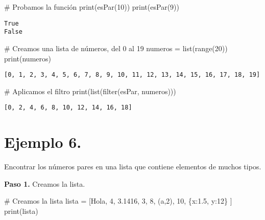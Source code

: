 \documentclass[
  letterpaper,
  DIV=11,
  numbers=noendperiod]{scrreprt}
\newenvironment{Shaded}{\begin{snugshade}}{\end{snugshade}}
\newcommand{\BuiltInTok}[1]{\textcolor[rgb]{0.00,0.23,0.31}{#1}}
\newcommand{\CommentTok}[1]{\textcolor[rgb]{0.37,0.37,0.37}{#1}}
\newcommand{\DecValTok}[1]{\textcolor[rgb]{0.68,0.00,0.00}{#1}}
\newcommand{\FloatTok}[1]{\textcolor[rgb]{0.68,0.00,0.00}{#1}}
\newcommand{\NormalTok}[1]{\textcolor[rgb]{0.00,0.23,0.31}{#1}}
\newcommand{\OperatorTok}[1]{\textcolor[rgb]{0.37,0.37,0.37}{#1}}
\newcommand{\StringTok}[1]{\textcolor[rgb]{0.13,0.47,0.30}{#1}}
\begin{document}
\begin{Shaded}
\begin{Highlighting}[]
\CommentTok{\# Probamos la función}
\BuiltInTok{print}\NormalTok{(esPar(}\DecValTok{10}\NormalTok{))}
\BuiltInTok{print}\NormalTok{(esPar(}\DecValTok{9}\NormalTok{))}
\end{Highlighting}
\end{Shaded}

\begin{verbatim}
True
False
\end{verbatim}

\begin{Shaded}
\begin{Highlighting}[]
\CommentTok{\# Creamos una lista de números, del 0 al 19}
\NormalTok{numeros }\OperatorTok{=} \BuiltInTok{list}\NormalTok{(}\BuiltInTok{range}\NormalTok{(}\DecValTok{20}\NormalTok{))}
\BuiltInTok{print}\NormalTok{(numeros)}
\end{Highlighting}
\end{Shaded}

\begin{verbatim}
[0, 1, 2, 3, 4, 5, 6, 7, 8, 9, 10, 11, 12, 13, 14, 15, 16, 17, 18, 19]
\end{verbatim}

\begin{Shaded}
\begin{Highlighting}[]
\CommentTok{\# Aplicamos el filtro}
\BuiltInTok{print}\NormalTok{(}\BuiltInTok{list}\NormalTok{(}\BuiltInTok{filter}\NormalTok{(esPar, numeros)))}
\end{Highlighting}
\end{Shaded}

\begin{verbatim}
[0, 2, 4, 6, 8, 10, 12, 14, 16, 18]
\end{verbatim}

\section{\texorpdfstring{\textbf{Ejemplo
6.}}{Ejemplo 6.}}\label{ejemplo-6.-1}

Encontrar los números pares en una lista que contiene elementos de
muchos tipos.

\textbf{Paso 1.} Creamos la lista.

\begin{Shaded}
\begin{Highlighting}[]
\CommentTok{\# Creamos la lista}
\NormalTok{lista }\OperatorTok{=}\NormalTok{ [}\StringTok{\textquotesingle{}Hola\textquotesingle{}}\NormalTok{, }\DecValTok{4}\NormalTok{, }\FloatTok{3.1416}\NormalTok{, }\DecValTok{3}\NormalTok{, }\DecValTok{8}\NormalTok{, (}\StringTok{\textquotesingle{}a\textquotesingle{}}\NormalTok{,}\DecValTok{2}\NormalTok{), }\DecValTok{10}\NormalTok{, \{}\StringTok{\textquotesingle{}x\textquotesingle{}}\NormalTok{:}\FloatTok{1.5}\NormalTok{, }\StringTok{\textquotesingle{}y\textquotesingle{}}\NormalTok{:}\DecValTok{12}\NormalTok{\} ]}
\BuiltInTok{print}\NormalTok{(lista)}
\end{Highlighting}
\end{Shaded}
\end{document}
